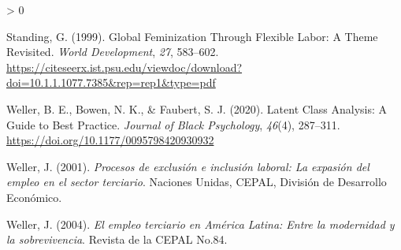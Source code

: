 \documentclass[
]{article}
\newlength{\cslhangindent}
\newenvironment{CSLReferences}[2] %
 {%
  \setlength{\parindent}{0pt}
  \ifodd #1 \everypar{\setlength{\hangindent}{\cslhangindent}}\ignorespaces\fi
  \ifnum #2 > 0
  \setlength{\parskip}{#2\baselineskip}
  \fi
 }%
 {}
\begin{document}
\begin{CSLReferences}{1}{0}
\leavevmode\hypertarget{ref-standing1999}{}%
Standing, G. (1999). Global {Feminization} {Through} {Flexible} {Labor}:
{A} {Theme} {Revisited}. \emph{World Development}, \emph{27}, 583--602.
\url{https://citeseerx.ist.psu.edu/viewdoc/download?doi=10.1.1.1077.7385\&rep=rep1\&type=pdf}

\leavevmode\hypertarget{ref-weller2020}{}%
Weller, B. E., Bowen, N. K., \& Faubert, S. J. (2020). Latent {Class}
{Analysis}: {A} {Guide} to {Best} {Practice}. \emph{Journal of Black
Psychology}, \emph{46}(4), 287--311.
\url{https://doi.org/10.1177/0095798420930932}

\leavevmode\hypertarget{ref-weller2001}{}%
Weller, J. (2001). \emph{Procesos de exclusión e inclusión laboral: La
expasión del empleo en el sector terciario}. Naciones Unidas, CEPAL,
División de Desarrollo Económico.

\leavevmode\hypertarget{ref-weller2004}{}%
Weller, J. (2004). \emph{El empleo terciario en {América} {Latina}:
Entre la modernidad y la sobrevivencia}. Revista de la CEPAL No.84.

\end{CSLReferences}
\end{document}

